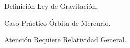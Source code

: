 \documentclass{beamer}
\begin{document}
\begin{frame}
\begin{block}{Definición}
    Ley de Gravitación.
\end{block}

\begin{exampleblock}{Caso Práctico}
    Órbita de Mercurio.
\end{exampleblock}

\begin{alertblock}{Atención}
    Requiere Relatividad General.
\end{alertblock}
\end{frame}
\end{document}
